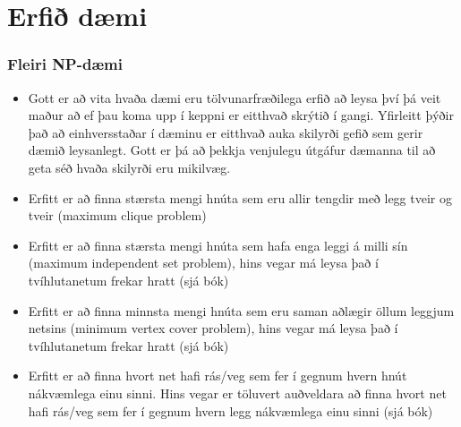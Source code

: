 \documentclass{beamer}
\begin{document}
\section[Erfið dæmi]{Erfið dæmi}

\begin{frame}
\frametitle{Fleiri NP-dæmi}

\begin{itemize}

\item<1-> Gott er að vita hvaða dæmi eru tölvunarfræðilega erfið að leysa því þá veit maður að ef þau koma upp í keppni er eitthvað skrýtið í gangi. Yfirleitt þýðir það að einhversstaðar í dæminu er eitthvað auka skilyrði gefið sem gerir dæmið leysanlegt. Gott er þá að þekkja venjulegu útgáfur dæmanna til að geta séð hvaða skilyrði eru mikilvæg.

\item<2-> Erfitt er að finna stærsta mengi hnúta sem eru allir tengdir með legg tveir og tveir (maximum clique problem)

\item<3-> Erfitt er að finna stærsta mengi hnúta sem hafa enga leggi á milli sín (maximum independent set problem), hins vegar má leysa það í tvíhlutanetum frekar hratt (sjá bók)

\item<4-> Erfitt er að finna minnsta mengi hnúta sem eru saman aðlægir öllum leggjum netsins (minimum vertex cover problem), hins vegar má leysa það í tvíhlutanetum frekar hratt (sjá bók)

\item<5-> Erfitt er að finna hvort net hafi rás/veg sem fer í gegnum hvern hnút nákvæmlega einu sinni. Hins vegar er töluvert auðveldara að finna hvort net hafi rás/veg sem fer í gegnum hvern legg nákvæmlega einu sinni (sjá bók)

\end{itemize}

\end{frame}
\end{document}
